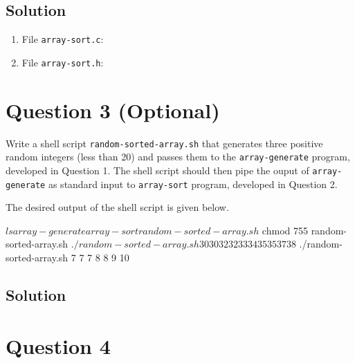\documentclass[12pt,letterpaper,twoside]{article}
\begin{document}

\subsection*{Solution}

\lstset{language=c,tabsize=4}
\begin{enumerate}
\item File \texttt{array-sort.c}:

\item File \texttt{array-sort.h}:

\end{enumerate}

\section*{Question 3 (Optional)}

Write a shell script \texttt{random-sorted-array.sh} that generates three positive random integers (less than 20) and passes them to the \texttt{array-generate} program, developed in Question 1.
The shell script should then pipe the ouput of \texttt{array-generate} as standard input to \texttt{array-sort} program, developed in Question 2.

The desired output of the shell script is given below.

\begin{terminal}
$ ls
array-generate array-sort random-sorted-array.sh
$ chmod 755 random-sorted-array.sh
$ ./random-sorted-array.sh
30 30 32 32 33 34 35 35 37 38
$ ./random-sorted-array.sh
7 7 7 8 8 9 10
\end{terminal}

\subsection*{Solution}

\lstset{language=bash,tabsize=4}


\section*{Question 4}
\end{document}
